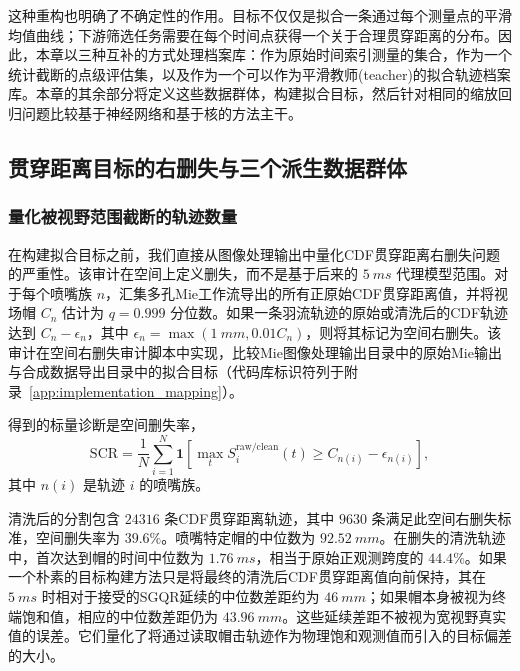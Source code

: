 这种重构也明确了不确定性的作用。目标不仅仅是拟合一条通过每个测量点的平滑均值曲线；下游筛选任务需要在每个时间点获得一个关于合理贯穿距离的分布。因此，本章以三种互补的方式处理档案库：作为原始时间索引测量的集合，作为一个统计截断的点级评估集，以及作为一个可以作为平滑教师(teacher)的拟合轨迹档案库。本章的其余部分将定义这些数据群体，构建拟合目标，然后针对相同的缩放回归问题比较基于神经网络和基于核的方法主干。

\subsection{贯穿距离目标的右删失与三个派生数据群体}
\label{sec:cdf-populations-en}

\subsubsection{量化被视野范围截断的轨迹数量}
\label{sec:cdf-spatial-censoring-audit}
\newcommand{\scrNTotal}{24316}%
\newcommand{\scrNCensored}{9630}%
\newcommand{\scrRatePct}{39.6}%
\newcommand{\scrNaiveHoldGapMedianMm}{46}%

在构建拟合目标之前，我们直接从图像处理输出中量化CDF贯穿距离右删失问题的严重性。该审计在空间上定义删失，而不是基于后来的 \(\SI{5}{ms}\) 代理模型范围。对于每个喷嘴族 \(n\)，汇集多孔Mie工作流导出的所有正原始CDF贯穿距离值，并将视场帽 \(C_n\) 估计为 \(q=0.999\) 分位数。如果一条羽流轨迹的原始或清洗后的CDF轨迹达到 \(C_n-\epsilon_n\)，其中 \(\epsilon_n=\max(\SI{1}{mm},0.01C_n)\)，则将其标记为空间右删失。该审计在空间右删失审计脚本中实现，比较Mie图像处理输出目录中的原始Mie输出与合成数据导出目录中的拟合目标（代码库标识符列于附录~\ref{app:implementation_mapping}）。

得到的标量诊断是空间删失率，
\[
\mathrm{SCR}
=
\frac{1}{N}\sum_{i=1}^{N}
\mathbf{1}\!\left[
\max_t S_i^{\mathrm{raw/clean}}(t)
\ge C_{n(i)}-\epsilon_{n(i)}
\right],
\]
其中 \(n(i)\) 是轨迹 \(i\) 的喷嘴族。

清洗后的分割包含 \(\num{\scrNTotal}\) 条CDF贯穿距离轨迹，其中 \(\num{\scrNCensored}\) 条满足此空间右删失标准，空间删失率为 \(\scrRatePct\%\)。喷嘴特定帽的中位数为 \(\SI{92.52}{mm}\)。在删失的清洗轨迹中，首次达到帽的时间中位数为 \(\SI{1.76}{ms}\)，相当于原始正观测跨度的 \(44.4\%\)。如果一个朴素的目标构建方法只是将最终的清洗后CDF贯穿距离值向前保持，其在 \(\SI{5}{ms}\) 时相对于接受的SGQR延续的中位数差距约为 \(\SI{\scrNaiveHoldGapMedianMm}{mm}\)；如果帽本身被视为终端饱和值，相应的中位数差距仍为 \(\SI{43.96}{mm}\)。这些延续差距不被视为宽视野真实值的误差。它们量化了将通过读取帽击轨迹作为物理饱和观测值而引入的目标偏差的大小。

